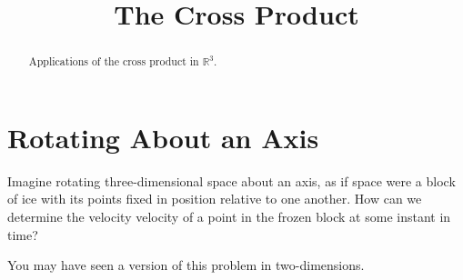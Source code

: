 \documentclass{ximera}
\title{The Cross Product}
\begin{document}
\begin{abstract}
Applications of the cross product in $\mathbb{R}^3$.
\end{abstract}
\maketitle

\section{Rotating About an Axis}

Imagine rotating three-dimensional space about an axis, as if space were a block of ice with its points fixed in position relative to one another. How can we determine the velocity velocity of a point in the frozen block at some instant in time?

You may have seen a version of this problem in two-dimensions.
\end{document}

